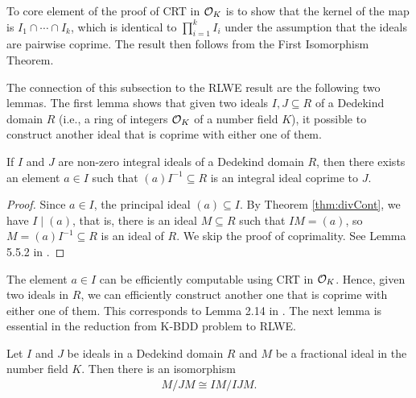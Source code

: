\documentclass[../main.tex]{subfiles}
\begin{document}
To core element of the proof of CRT in $\mathcal{O}_K$ %
is to show that the kernel of the map is $I_1 \cap \cdots \cap I_k$, which is identical to $\prod_{i=1}^k I_i$ under the assumption that the ideals are pairwise coprime. The result then  follows from the First Isomorphism Theorem. 

The connection of this subsection to the RLWE result are the following two lemmas. The first lemma shows that given two ideals $I, J \subseteq R$ of a Dedekind domain $R$ (i.e., a ring of integers $\mathcal{O}_K$ of a number field $K$), it possible to construct another ideal that is coprime with either one of them. 

\begin{lemma}
\label{lm:coprimeIdeals}
If $I$ and $J$ are non-zero integral ideals of a Dedekind domain $R$, then there exists an element $a \in I$ such that $(a)I^{-1} \subseteq R$ is an integral ideal coprime to $J$. 
\end{lemma}

\begin{proof}
Since $a \in I$, the principal ideal $(a) \subseteq I$. By Theorem \ref{thm:divCont}, we have $I \mid (a)$, that is, there is an ideal $M \subseteq R$ such that $IM=(a)$, so $M=(a)I^{-1} \subseteq R$ is an ideal of $R$. We skip the proof of coprimality. %
See Lemma 5.5.2 in \cite{stein2012algebraic}.
\end{proof}

The element $a \in I$ can be efficiently computable using CRT in $\mathcal{O}_K$. Hence, given two ideals in $R$, we can efficiently construct another one that is coprime with either one of them. This corresponds to Lemma 2.14 in \cite{lyubashevsky2010ideal}. The next lemma is essential in the reduction from K-BDD problem to RLWE. 

\begin{lemma}
Let $I$ and $J$ be ideals in a Dedekind domain $R$ and $M$ be a fractional ideal in the number field $K$. Then there is an isomorphism 
\begin{align*}
    M/JM \cong IM/IJM.
\end{align*}
\end{lemma}
\end{document}
